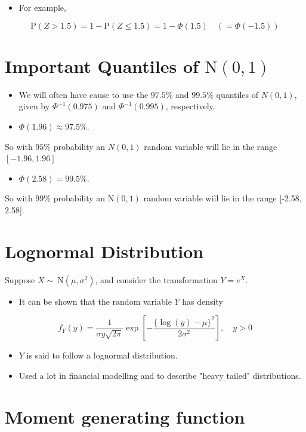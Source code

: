 \documentclass[10pt]{article}
\begin{document}
\begin{itemize}
  \item For example,
\end{itemize}

$$
\mathrm{P}(Z>1.5)=1-\mathrm{P}(Z \leq 1.5)=1-\Phi(1.5) \quad(=\Phi(-1.5))
$$

\section*{Important Quantiles of $\mathrm{N}(0,1)$}
\begin{itemize}
  \item We will often have cause to use the $97.5 \%$ and $99.5 \%$ quantiles of $N(0,1)$, given by $\Phi^{-1}(0.975)$ and $\Phi^{-1}(0.995)$, respectively.
  \item $\Phi(1.96) \approx 97.5 \%$.
\end{itemize}

So with $95 \%$ probability an $N(0,1)$ random variable will lie in the range $[-1.96,1.96]$

\begin{itemize}
  \item $\Phi(2.58)=99.5 \%$.
\end{itemize}

So with $99 \%$ probability an $\mathrm{N}(0,1)$ random variable will lie in the range [-2.58, 2.58].

\section*{Lognormal Distribution}
Suppose $X \sim \mathrm{~N}\left(\mu, \sigma^{2}\right)$, and consider the transformation $Y=e^{X}$.

\begin{itemize}
  \item It can be shown that the random variable $Y$ has density
\end{itemize}

$$
f_{Y}(y)=\frac{1}{\sigma y \sqrt{2 \pi}} \exp \left[-\frac{\{\log (y)-\mu\}^{2}}{2 \sigma^{2}}\right], \quad y>0
$$

\begin{itemize}
  \item $Y$ is said to follow a lognormal distribution.
  \item Used a lot in financial modelling and to describe "heavy tailed" distributions.
\end{itemize}

\section*{Moment generating function}
\end{document}
